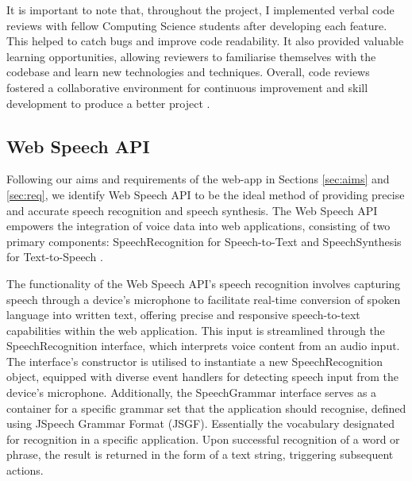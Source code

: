\documentclass{l4proj}
\begin{document}
It is important to note that, throughout the project, I implemented verbal code reviews with fellow Computing Science students after developing each feature. This helped to catch bugs and improve code readability. It also provided valuable learning opportunities, allowing reviewers to familiarise themselves with the codebase and learn new technologies and techniques. Overall, code reviews fostered a collaborative environment for continuous improvement and skill development to produce a better project \citep{Atlassian}.

\subsection{Web Speech API}
\label{sec:web-speech-API}

Following our aims and requirements of the web-app in Sections \ref{sec:aims} and \ref{sec:req}, we identify Web Speech API to be the ideal method of providing precise and accurate speech recognition and speech synthesis. The Web Speech API empowers the integration of voice data into web applications, consisting of two primary components:  SpeechRecognition for Speech-to-Text and SpeechSynthesis for Text-to-Speech \citep{MozDevNet_2023}. 

The functionality of the Web Speech API's speech recognition involves capturing speech through a device's microphone to facilitate real-time conversion of spoken language into written text, offering precise and responsive speech-to-text capabilities within the web application. This input is streamlined through the SpeechRecognition interface, which interprets voice content from an audio input. The interface's constructor is utilised to instantiate a new SpeechRecognition object, equipped with diverse event handlers for detecting speech input from the device's microphone. Additionally, the SpeechGrammar interface serves as a container for a specific grammar set that the application should recognise, defined using JSpeech Grammar Format (JSGF). Essentially the vocabulary designated for recognition in a specific application. Upon successful recognition of a word or phrase, the result is returned in the form of a text string, triggering subsequent actions.
\end{document}
